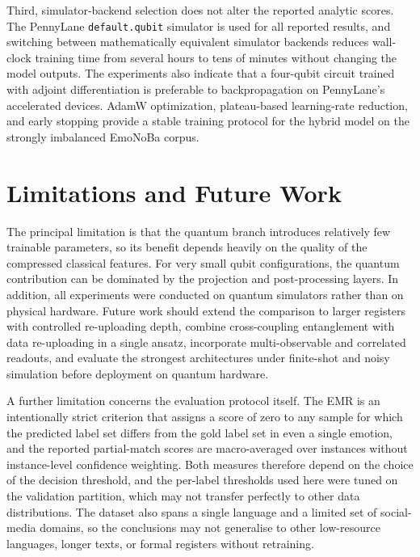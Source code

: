 \documentclass[runningheads]{llncs}
\begin{document}
Third, simulator-backend selection does not alter the reported analytic scores. The PennyLane \texttt{default.qubit} simulator is used for all reported results, and switching between mathematically equivalent simulator backends reduces wall-clock training time from several hours to tens of minutes without changing the model outputs. The experiments also indicate that a four-qubit circuit trained with adjoint differentiation is preferable to backpropagation on PennyLane's accelerated devices. AdamW optimization, plateau-based learning-rate reduction, and early stopping provide a stable training protocol for the hybrid model on the strongly imbalanced EmoNoBa corpus.

\section{Limitations and Future Work}\label{sec:limitations}
The principal limitation is that the quantum branch introduces relatively few trainable parameters, so its benefit depends heavily on the quality of the compressed classical features. For very small qubit configurations, the quantum contribution can be dominated by the projection and post-processing layers. In addition, all experiments were conducted on quantum simulators rather than on physical hardware. Future work should extend the comparison to larger registers with controlled re-uploading depth, combine cross-coupling entanglement with data re-uploading in a single ansatz, incorporate multi-observable and correlated readouts, and evaluate the strongest architectures under finite-shot and noisy simulation before deployment on quantum hardware.

A further limitation concerns the evaluation protocol itself. The EMR is an intentionally strict criterion that assigns a score of zero to any sample for which the predicted label set differs from the gold label set in even a single emotion, and the reported partial-match scores are macro-averaged over instances without instance-level confidence weighting. Both measures therefore depend on the choice of the decision threshold, and the per-label thresholds used here were tuned on the validation partition, which may not transfer perfectly to other data distributions. The dataset also spans a single language and a limited set of social-media domains, so the conclusions may not generalise to other low-resource languages, longer texts, or formal registers without retraining.




\end{document}
